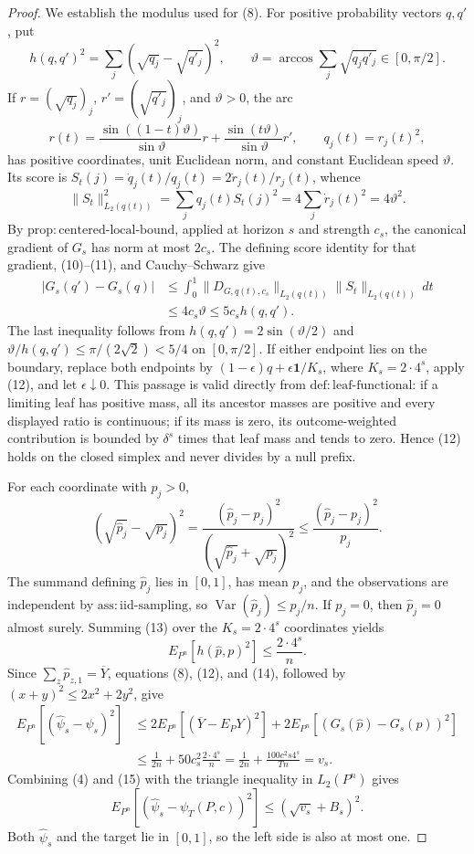 \documentclass{article}
\begin{document}
\begin{proof}
We establish the modulus used for (8).  For positive probability vectors \(q,q'\), put
\[
h(q,q')^2=\sum_j(\sqrt{q_j}-\sqrt{q'_j})^2,
\qquad
\vartheta=\arccos\sum_j\sqrt{q_jq'_j}\in[0,\pi/2].
\tag{9}
\]
If \(r=(\sqrt{q_j})_j\), \(r'=(\sqrt{q'_j})_j\), and \(\vartheta>0\), the arc
\[
r(t)=\frac{\sin((1-t)\vartheta)}{\sin\vartheta}r
     +\frac{\sin(t\vartheta)}{\sin\vartheta}r',
\qquad q_j(t)=r_j(t)^2,
\tag{10}
\]
has positive coordinates, unit Euclidean norm, and constant Euclidean speed \(\vartheta\).  Its score is \(S_t(j)=\dot q_j(t)/q_j(t)=2\dot r_j(t)/r_j(t)\), whence
\[
\|S_t\|_{L_2(q(t))}^2
=\sum_jq_j(t)S_t(j)^2
=4\sum_j\dot r_j(t)^2
=4\vartheta^2.
\tag{11}
\]
By \(\mathrm{prop:centered\text{-}local\text{-}bound}\), applied at horizon \(s\) and strength \(c_s\), the canonical gradient of \(G_s\) has norm at most \(2c_s\).  The defining score identity for that gradient, (10)--(11), and Cauchy--Schwarz give
\[
\begin{aligned}
|G_s(q')-G_s(q)|
&\leq\int_0^1\|D_{G,q(t),c_s}\|_{L_2(q(t))}\|S_t\|_{L_2(q(t))}\,dt\\
&\leq4c_s\vartheta
\leq5c_s h(q,q').
\end{aligned}
\tag{12}
\]
The last inequality follows from \(h(q,q')=2\sin(\vartheta/2)\) and \(\vartheta/h(q,q')\leq\pi/(2\sqrt2)<5/4\) on \([0,\pi/2]\).  If either endpoint lies on the boundary, replace both endpoints by \((1-\epsilon)q+\epsilon\mathbf1/K_s\), where \(K_s=2\cdot4^s\), apply (12), and let \(\epsilon\downarrow0\).  This passage is valid directly from \(\mathrm{def:leaf\text{-}functional}\): if a limiting leaf has positive mass, all its ancestor masses are positive and every displayed ratio is continuous; if its mass is zero, its outcome-weighted contribution is bounded by \(\delta^s\) times that leaf mass and tends to zero.  Hence (12) holds on the closed simplex and never divides by a null prefix.

For each coordinate with \(p_j>0\),
\[
(\sqrt{\widehat p_j}-\sqrt{p_j})^2
=\frac{(\widehat p_j-p_j)^2}{(\sqrt{\widehat p_j}+\sqrt{p_j})^2}
\leq\frac{(\widehat p_j-p_j)^2}{p_j}.
\tag{13}
\]
The summand defining \(\widehat p_j\) lies in \([0,1]\), has mean \(p_j\), and the observations are independent by \(\mathrm{ass:iid\text{-}sampling}\), so \(\operatorname{Var}(\widehat p_j)\leq p_j/n\).  If \(p_j=0\), then \(\widehat p_j=0\) almost surely.  Summing (13) over the \(K_s=2\cdot4^s\) coordinates yields
\[
E_{P^n}[h(\widehat p,p)^2]\leq\frac{2\cdot4^s}{n}.
\tag{14}
\]
Since \(\sum_z\widehat p_{z,1}=\overline Y\), equations (8), (12), and (14), followed by \((x+y)^2\leq2x^2+2y^2\), give
\[
\begin{aligned}
E_{P^n}[(\widehat\psi_s-\psi_s)^2]
&\leq2E_{P^n}[(\overline Y-E_PY)^2]
  +2E_{P^n}[(G_s(\widehat p)-G_s(p))^2]\\
&\leq\frac1{2n}+50c_s^2\frac{2\cdot4^s}{n}
=\frac1{2n}+\frac{100c^2s4^s}{Tn}=v_s.
\end{aligned}
\tag{15}
\]
Combining (4) and (15) with the triangle inequality in \(L_2(P^n)\) gives
\[
E_{P^n}[(\widehat\psi_s-\psi_T(P,c))^2]
\leq(\sqrt{v_s}+B_s)^2.
\tag{16}
\]
Both \(\widehat\psi_s\) and the target lie in \([0,1]\), so the left side is also at most one.


\end{proof}
\end{document}
